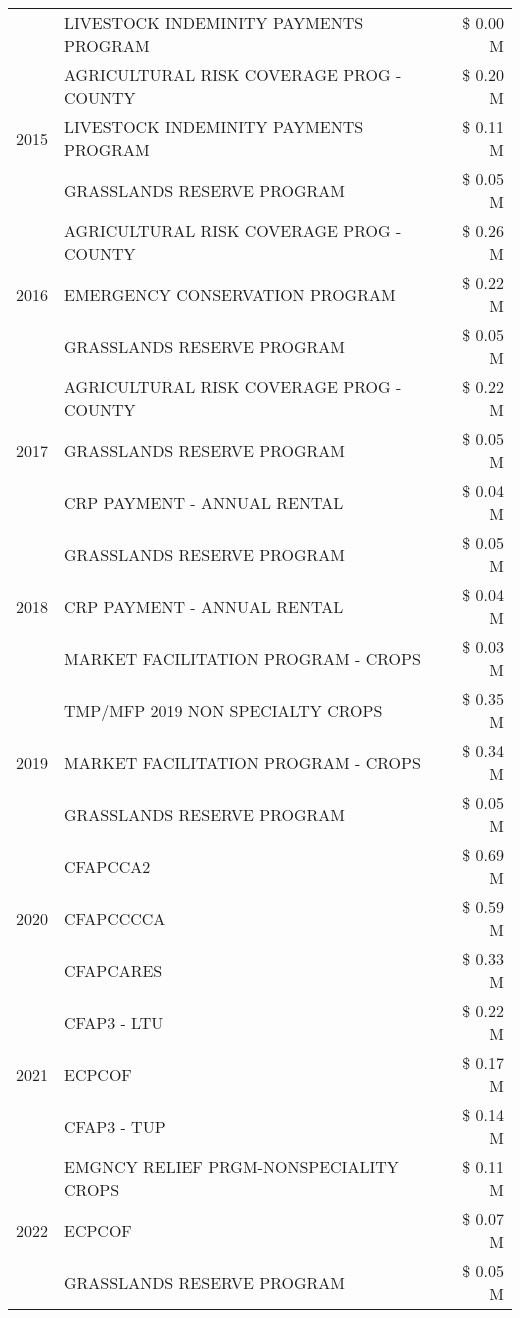 \begin{tabular}{llr}
 & LIVESTOCK INDEMINITY PAYMENTS PROGRAM & \$ 0.00 M \\
\cline{1-3}
\multirow[t]{3}{*}{2015} & AGRICULTURAL RISK COVERAGE PROG - COUNTY & \$ 0.20 M \\
 & LIVESTOCK INDEMINITY PAYMENTS PROGRAM & \$ 0.11 M \\
 & GRASSLANDS RESERVE PROGRAM & \$ 0.05 M \\
\cline{1-3}
\multirow[t]{3}{*}{2016} & AGRICULTURAL RISK COVERAGE PROG - COUNTY & \$ 0.26 M \\
 & EMERGENCY CONSERVATION PROGRAM & \$ 0.22 M \\
 & GRASSLANDS RESERVE PROGRAM & \$ 0.05 M \\
\cline{1-3}
\multirow[t]{3}{*}{2017} & AGRICULTURAL RISK COVERAGE PROG - COUNTY & \$ 0.22 M \\
 & GRASSLANDS RESERVE PROGRAM & \$ 0.05 M \\
 & CRP PAYMENT - ANNUAL RENTAL & \$ 0.04 M \\
\cline{1-3}
\multirow[t]{3}{*}{2018} & GRASSLANDS RESERVE PROGRAM & \$ 0.05 M \\
 & CRP PAYMENT - ANNUAL RENTAL & \$ 0.04 M \\
 & MARKET FACILITATION PROGRAM - CROPS & \$ 0.03 M \\
\cline{1-3}
\multirow[t]{3}{*}{2019} & TMP/MFP 2019 NON SPECIALTY CROPS & \$ 0.35 M \\
 & MARKET FACILITATION PROGRAM - CROPS & \$ 0.34 M \\
 & GRASSLANDS RESERVE PROGRAM & \$ 0.05 M \\
\cline{1-3}
\multirow[t]{3}{*}{2020} & CFAPCCA2 & \$ 0.69 M \\
 & CFAPCCCCA & \$ 0.59 M \\
 & CFAPCARES & \$ 0.33 M \\
\cline{1-3}
\multirow[t]{3}{*}{2021} & CFAP3 - LTU & \$ 0.22 M \\
 & ECPCOF & \$ 0.17 M \\
 & CFAP3 - TUP & \$ 0.14 M \\
\cline{1-3}
\multirow[t]{3}{*}{2022} & EMGNCY RELIEF PRGM-NONSPECIALITY CROPS & \$ 0.11 M \\
 & ECPCOF & \$ 0.07 M \\
 & GRASSLANDS RESERVE PROGRAM & \$ 0.05 M \\
\cline{1-3}
\bottomrule
\end{tabular}
